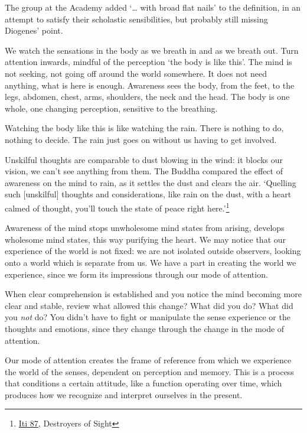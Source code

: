 The group at the Academy added `\ldots{} with broad flat nails' to the
definition, in an attempt to satisfy their scholastic sensibilities, but
probably still missing Diogenes' point.


We watch the sensations in the body as we breath in and as we breath
out. Turn attention inwards, mindful of the perception `the body is like
this'. The mind is not seeking, not going off around the world
somewhere. It does not need anything, what is here is enough. Awareness
sees the body, from the feet, to the legs, abdomen, chest, arms,
shoulders, the neck and the head. The body is one whole, one changing
perception, sensitive to the breathing.

\enlargethispage*{\baselineskip}

Watching the body like this is like watching the rain. There is nothing
to do, nothing to decide. The rain just goes on without us having to get
involved.

\clearpage


Unskilful thoughts are comparable to dust blowing in the wind: it blocks
our vision, we can't see anything from them. The Buddha compared the
effect of awareness on the mind to rain, as it settles the dust and
clears the air. `Quelling such {[}unskilful{]} thoughts and
considerations, like rain on the dust, with a heart calmed of thought,
you'll touch the state of peace right here.'\footnote{\href{https://suttacentral.net/iti87/en/sujato}{Iti
  87}, Destroyers of Sight}

Awareness of the mind stops unwholesome mind states from arising,
develops wholesome mind states, this way purifying the heart. We may
notice that our experience of the world is not fixed: we are not
isolated outside observers, looking onto a world which is separate from
us. We have a part in creating the world we experience, since we form
its impressions through our mode of attention.

When clear comprehension is established and you notice the mind becoming
more clear and stable, review what allowed this change? What did you do?
What did you \emph{not} do? You didn't have to fight or manipulate the
sense experience or the thoughts and emotions, since they change through
the change in the mode of attention.

Our mode of attention creates the frame of reference from which we
experience the world of the senses, dependent on perception and memory.
This is a process that conditions a certain attitude, like a function
operating over time, which produces how we recognize and interpret
ourselves in the present.


